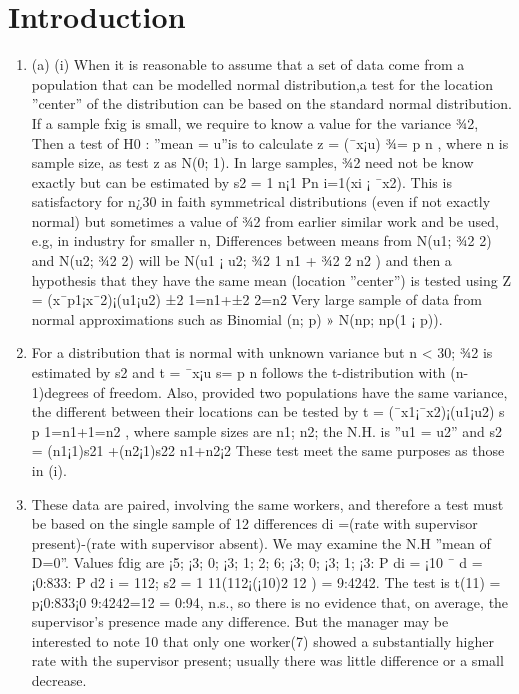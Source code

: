 \documentclass[a4paper,12pt]{article}
\begin{document}
\maketitle

\section{Introduction}
\begin{enumerate}
    \item (a) (i) When it is reasonable to assume that a set of data come from a population that can
be modelled normal distribution,a test for the location ”center” of the distribution
can be based on the standard normal distribution. If a sample fxig is small, we
require to know a value for the variance ¾2, Then a test of H0 : ”mean = u”is to
calculate z = (¯x¡u)
¾=
p
n , where n is sample size, as test z as N(0; 1). In large samples,
¾2 need not be know exactly but can be estimated by s2 = 1
n¡1
Pn
i=1(xi ¡ ¯x2).
This is satisfactory for n¿30 in faith symmetrical distributions (even if not exactly
normal) but sometimes a value of ¾2 from earlier similar work and be used, e.g,
in industry for smaller n, Differences between means from N(u1; ¾2
2) and N(u2; ¾2
2)
will be N(u1 ¡ u2; ¾2
1
n1
+ ¾2
2
n2
) and then a hypothesis that they have the same mean
(location ”center”) is tested using Z = (x¯p1¡x¯2)¡(u1¡u2)
±2
1=n1+±2
2=n2
Very large sample of data
from normal approximations such as Binomial (n; p) » N(np; np(1 ¡ p)).
\item For a distribution that is normal with unknown variance but n < 30; ¾2 is estimated
by s2 and t = ¯x¡u
s=
p
n follows the t-distribution with (n-1)degrees of freedom.
Also, provided two populations have the same variance, the different between their
locations can be tested by t = (¯x1¡¯x2)¡(u1¡u2)
s
p
1=n1+1=n2
, where sample sizes are n1; n2; the
N.H. is ”u1 = u2” and s2 = (n1¡1)s21
+(n2¡1)s22
n1+n2¡2 These test meet the same purposes as
those in (i).
\item  These data are paired, involving the same workers, and therefore a test must be based on
the single sample of 12 differences di =(rate with supervisor present)-(rate with supervisor
absent). We may examine the N.H ”mean of D=0”. Values fdig are ¡5; ¡3; 0; ¡3; 1; 2; 6;
¡3; 0; ¡3; 1; ¡3:
P
di = ¡10 ¯ d = ¡0:833:
P
d2
i = 112; s2 = 1
11(112¡(¡10)2
12 ) = 9:4242.
The test is t(11) = p¡0:833¡0
9:4242=12
= 0:94, n.s., so there is no evidence that, on average, the
supervisor’s presence made any difference. But the manager may be interested to note
10
that only one worker(7) showed a substantially higher rate with the supervisor present;
usually there was little difference or a small decrease.
\end{enumerate}
\end{document}
